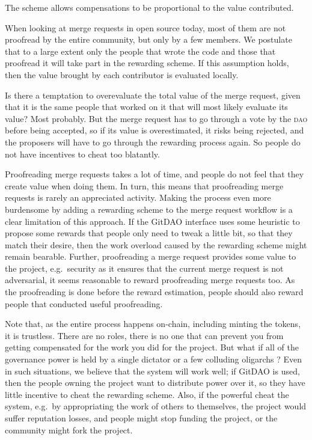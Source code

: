 %
The scheme allows compensations to be proportional to the value contributed.

%
When looking at merge requests in open source today, most of them are not proofread by the entire community, but only by a few members.
We postulate that to a large extent only the people that wrote the code and those that proofread it will take part in the rewarding scheme.
If this assumption holds, then the value brought by each contributor is evaluated locally.

Is there a temptation to overevaluate the total value of the merge request, given that it is the same people that worked on it that will most likely evaluate its value?
Most probably.
But the merge request has to go through a vote by the \textsc{dao} before being accepted, so if its value is overestimated, it risks being rejected, and the proposers will have to go through the rewarding process again.
So people do not have incentives to cheat too blatantly.

Proofreading merge requests takes a lot of time, and people do not feel that they create value when doing them.
In turn, this means that proofreading merge requests is rarely an appreciated activity.
Making the process even more burdensome by adding a rewarding scheme to the merge request workflow is a clear limitation of this approach.
If the GitDAO interface uses some heuristic to propose some rewards that people only need to tweak a little bit, so that they match their desire, then the work overload caused by the rewarding scheme might remain bearable.
Further, proofreading a merge request provides some value to the project, e.g.\ security as it ensures that the current merge request is not adversarial, it seems reasonable to reward proofreading merge requests too.
As the proofreading is done before the reward estimation, people should also reward people that conducted useful proofreading.

Note that, as the entire process happens on-chain, including minting the tokens, it is trustless.
There are no roles, there is no one that can prevent you from getting compensated for the work you did for the project.
But what if all of the governance power is held by a single dictator or a few colluding oligarchs%
?
Even in such situations, we believe that the system will work well; if GitDAO is used, then the people owning the project want to distribute power over it, so they have little incentive to cheat the rewarding scheme.
Also, if the powerful cheat the system, e.g.\ by appropriating the work of others to themselves, the project would suffer reputation losses, and people might stop funding the project, or the community might fork the project.

